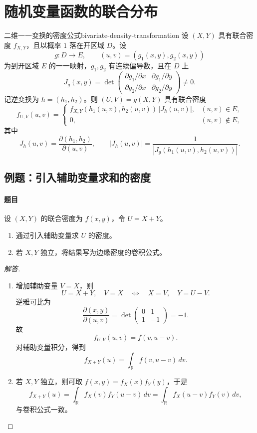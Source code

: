 \clearpage\section{随机变量函数的联合分布}\label{k:jacobian}

\begin{mytheorem}{二维一一变换的密度公式}{bivariate-density-transformation}
设 $(X,Y)$ 具有联合密度 $f_{X,Y}$，且以概率 $1$ 落在开区域 $D$。设
\[
g:D\to E,\qquad (u,v)=(g_1(x,y),g_2(x,y))
\]
为到开区域 $E$ 的一一映射，$g_1,g_2$ 有连续偏导数，且在 $D$ 上
\[
J_g(x,y)=\det
\begin{pmatrix}
\partial g_1/\partial x&\partial g_1/\partial y\\
\partial g_2/\partial x&\partial g_2/\partial y
\end{pmatrix}\ne0.
\]
记逆变换为 $h=(h_1,h_2)$。则 $(U,V)=g(X,Y)$ 具有联合密度
\[
f_{U,V}(u,v)=
\begin{cases}
f_{X,Y}(h_1(u,v),h_2(u,v))\,|J_h(u,v)|,&(u,v)\in E,\\
0,&(u,v)\notin E,
\end{cases}
\]
其中
\[
J_h(u,v)=\frac{\partial(h_1,h_2)}{\partial(u,v)},\qquad
|J_h(u,v)|=\frac1{|J_g(h_1(u,v),h_2(u,v))|}.
\]
\end{mytheorem}

\subsection{例题：引入辅助变量求和的密度}\label{note:c3:e18}
\paragraph{题目}
设 $(X,Y)$ 的联合密度为 $f(x,y)$，令 $U=X+Y$。
\begin{enumerate}
\item 通过引入辅助变量求 $U$ 的密度。

\item 若 $X,Y$ 独立，将结果写为边缘密度的卷积公式。
\end{enumerate}

\begin{proof}[解答]
\begin{enumerate}
\item 增加辅助变量 $V=X$，则
\[
U=X+Y,\quad V=X
\quad\Longleftrightarrow\quad
X=V,\quad Y=U-V.
\]
逆雅可比为
\[
\frac{\partial(x,y)}{\partial(u,v)}
=\det\begin{pmatrix}0&1\\1&-1\end{pmatrix}=-1.
\]
故
\[
f_{U,V}(u,v)=f(v,u-v).
\]
对辅助变量积分，得到
\[
f_{X+Y}(u)=\int_{\mathbb R}f(v,u-v)\,dv.
\]

\item 若 $X,Y$ 独立，则可取 $f(x,y)=f_X(x)f_Y(y)$，于是
\[
f_{X+Y}(u)=\int_{\mathbb R}f_X(v)f_Y(u-v)\,dv
=\int_{\mathbb R}f_X(u-v)f_Y(v)\,dv,
\]
与卷积公式一致。
\end{enumerate}
\end{proof}

